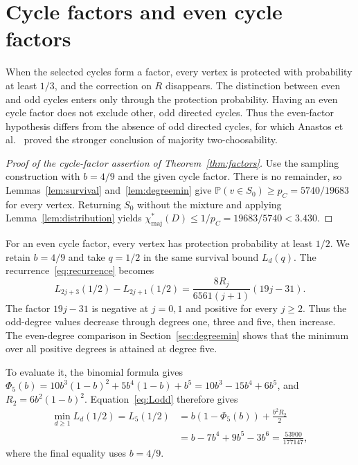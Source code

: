 \documentclass[10pt,a4paper]{article}
\newcommand{\Pp}{\mathbb P}
\newcommand{\chif}{\chi^*_{\mathrm{maj}}}
\begin{document}
\section{Cycle factors and even cycle factors}\label{sec:factors}
When the selected cycles form a factor, every vertex is protected with probability at least \(1/3\), and the correction on \(R\) disappears. The distinction between even and odd cycles enters only through the protection probability. Having an even cycle factor does not exclude other, odd directed cycles. Thus the even-factor hypothesis differs from the absence of odd directed cycles, for which Anastos et al.~\cite{ALSS} proved the stronger conclusion of majority two-choosability.

\begin{proof}[Proof of the cycle-factor assertion of Theorem~\ref{thm:factors}]
Use the sampling construction with \(b=4/9\) and the given cycle factor. There is no remainder, so Lemmas~\ref{lem:survival} and~\ref{lem:degreemin} give \(\Pp(v\in S_0)\ge p_C=5740/19683\) for every vertex. Returning \(S_0\) without the mixture and applying Lemma~\ref{lem:distribution} yields \(\chif(D)\le1/p_C=19683/5740<3.430\).
\end{proof}

For an even cycle factor, every vertex has protection probability at least \(1/2\). We retain \(b=4/9\) and take \(q=1/2\) in the same survival bound \(L_d(q)\). The recurrence~\eqref{eq:recurrence} becomes
\begin{equation}\label{eq:evenrecurrence}
L_{2j+3}(1/2)-L_{2j+1}(1/2)
=\frac{8R_j}{6561(j+1)}(19j-31).
\end{equation}
The factor \(19j-31\) is negative at \(j=0,1\) and positive for every \(j\ge2\). Thus the odd-degree values decrease through degrees one, three and five, then increase. The even-degree comparison in Section~\ref{sec:degreemin} shows that the minimum over all positive degrees is attained at degree five.

To evaluate it, the binomial formula gives \(\Phi_5(b)=10b^3(1-b)^2+5b^4(1-b)+b^5=10b^3-15b^4+6b^5\), and \(R_2=6b^2(1-b)^2\). Equation~\eqref{eq:Lodd} therefore gives
\begin{equation}\label{eq:evenminimum}
\begin{aligned}
\min_{d\ge1}L_d(1/2)=L_5(1/2)
&=b(1-\Phi_5(b))+\frac{b^2R_2}{2}\\
&=b-7b^4+9b^5-3b^6=\frac{53900}{177147},
\end{aligned}
\end{equation}
where the final equality uses \(b=4/9\).
\end{document}
